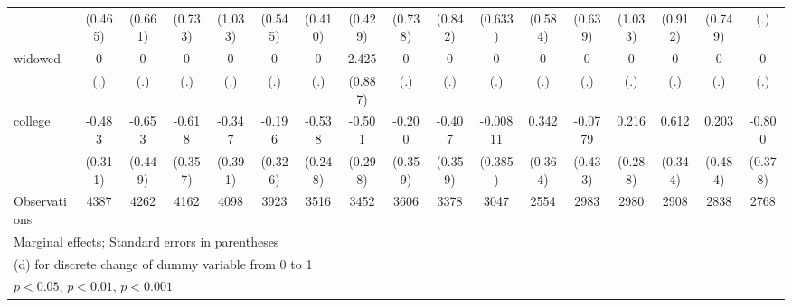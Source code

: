{\begin{tabular}{l*{16}{c}}
                    &     (0.465)         &     (0.661)         &     (0.733)         &     (1.033)         &     (0.545)         &     (0.410)         &     (0.429)         &     (0.738)         &     (0.842)         &     (0.633)         &     (0.584)         &     (0.639)         &     (1.033)         &     (0.912)         &     (0.749)         &         (.)         \\
[1em]
widowed             &           0         &           0         &           0         &           0         &           0         &           0         &       2.425\sym{**} &           0         &           0         &           0         &           0         &           0         &           0         &           0         &           0         &           0         \\
                    &         (.)         &         (.)         &         (.)         &         (.)         &         (.)         &         (.)         &     (0.887)         &         (.)         &         (.)         &         (.)         &         (.)         &         (.)         &         (.)         &         (.)         &         (.)         &         (.)         \\
[1em]
college             &      -0.483         &      -0.653         &      -0.618         &      -0.347         &      -0.196         &      -0.538\sym{*}  &      -0.501         &      -0.200         &      -0.407         &    -0.00811         &       0.342         &     -0.0779         &       0.216         &       0.612         &       0.203         &      -0.800\sym{*}  \\
                    &     (0.311)         &     (0.449)         &     (0.357)         &     (0.391)         &     (0.326)         &     (0.248)         &     (0.298)         &     (0.359)         &     (0.359)         &     (0.385)         &     (0.364)         &     (0.433)         &     (0.288)         &     (0.344)         &     (0.484)         &     (0.378)         \\
\hline
Observations        &        4387         &        4262         &        4162         &        4098         &        3923         &        3516         &        3452         &        3606         &        3378         &        3047         &        2554         &        2983         &        2980         &        2908         &        2838         &        2768         \\
\hline\hline
\multicolumn{17}{l}{\footnotesize Marginal effects; Standard errors in parentheses}\\
\multicolumn{17}{l}{\footnotesize  (d) for discrete change of dummy variable from 0 to 1}\\
\multicolumn{17}{l}{\footnotesize \sym{*} \(p<0.05\), \sym{**} \(p<0.01\), \sym{***} \(p<0.001\)}\\
\end{tabular}
}
